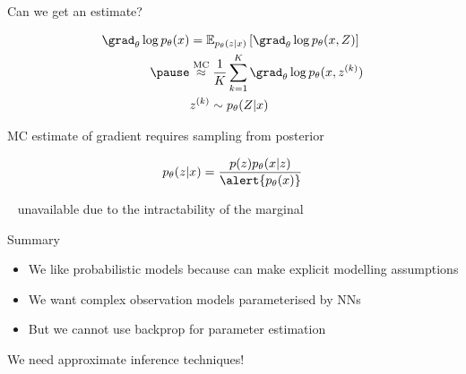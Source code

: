 \begin{frame}{Can we get an estimate?}

\begin{equation*}
\begin{aligned}
\grad_\theta \log p_\theta(x) 
 &= \mathbb E_{p_\theta(z|x)} \left[ \grad_\theta \log p_\theta(x,Z) \right] \\ \pause
 &\overset{\text{MC}}{\approx} \frac{1}{K} \sum_{k=1}^K \grad_\theta \log p_\theta(x,z^{(k)})  \\
 & z^{(k)} \sim p_\theta(Z|x)
\end{aligned}
\end{equation*}


 \pause

MC estimate of gradient requires sampling from posterior
\begin{small}
\begin{equation*}
p_\theta(z|x) = \frac{p(z)p_\theta(x|z)}{\alert{p_\theta(x)}}
\end{equation*}
\end{small}
~ unavailable due to the intractability of the marginal

\end{frame}


\begin{frame}{Summary}

\begin{itemize}
	\item We like probabilistic models because can make explicit modelling assumptions \pause
	\item We want complex observation models 
	parameterised by NNs \pause
	\item But we cannot use backprop for parameter estimation 
\end{itemize}

\pause

We need \alert{approximate inference} techniques!

\end{frame}
